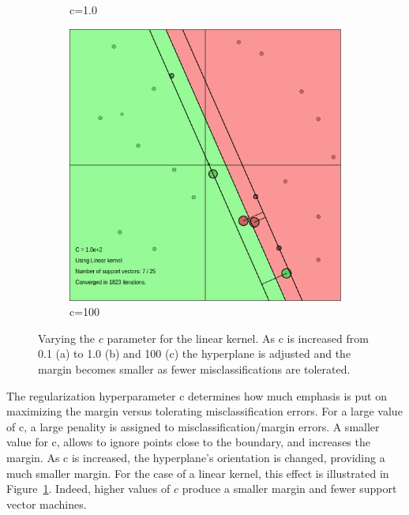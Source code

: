 \documentclass{article}
\begin{document}
\begin{figure}[]
\begin{subfigure}{0.33\linewidth}
            \caption{c=1.0}
        \end{subfigure}
        \begin{subfigure}{0.33\linewidth}
            \includegraphics[width=\linewidth]{svmc100}
            \caption{c=100}
        \end{subfigure}



        \caption{Varying the $c$ parameter for the linear kernel. As c is increased from 0.1 (a) to 1.0 (b) and 100 (c) the hyperplane is adjusted and the margin becomes smaller as fewer misclassifications are tolerated.  }        
        
              
        \label{fig:c}
    \end{figure}

The regularization hyperparameter c determines how much emphasis is put on maximizing the margin versus tolerating misclassification errors. For a large value of c, a large penality is assigned to misclassification/margin errors. A smaller value for c, allows to ignore points close to the boundary, and increases the margin. As c is increased, the hyperplane's orientation is changed, providing a much smaller margin. For the case of a linear kernel, this effect is illustrated in Figure~\ref{fig:c}. Indeed, higher values of $c$ produce a smaller margin and fewer support vector machines.
\end{document}
